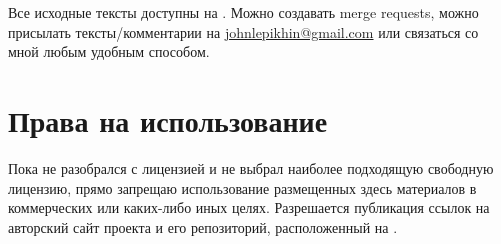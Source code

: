 \documentclass[11pt,fleqn]{report} %
\begin{document}
Все исходные тексты доступны на \gitRepo. Можно создавать merge
requests, можно присылать тексты/комментарии на
\href{mailto:johnlepikhin@gmail.com}{johnlepikhin@gmail.com} или
связаться со мной любым удобным способом.

\section{Права на использование}

Пока не разобрался с лицензией и не выбрал наиболее подходящую
свободную лицензию, прямо запрещаю использование размещенных здесь
материалов в коммерческих или каких-либо иных целях. Разрешается
публикация ссылок на авторский сайт проекта и его репозиторий,
расположенный на \gitRepo.
\end{document}
